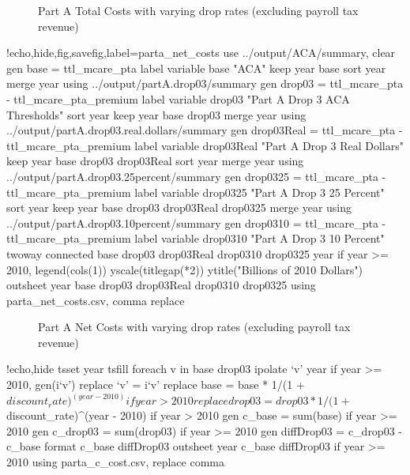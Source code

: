 \documentclass{article}
\begin{document}
\begin{figure}[ht]
\centering
{}
\caption{Part A Total Costs with varying drop rates (excluding payroll tax revenue)}
\label{fig:drop_costs}
\end{figure}

\begin{Statacode}{!echo,hide,fig,savefig,label=parta_net_costs}
use ../output/ACA/summary, clear
gen base = ttl_mcare_pta
label variable base "ACA"
keep year base
sort year
merge year using ../output/partA.drop03/summary
gen drop03 = ttl_mcare_pta - ttl_mcare_pta_premium
label variable drop03 "Part A Drop 3 ACA Thresholds"
sort year
keep year base drop03
merge year using ../output/partA.drop03.real.dollars/summary
gen drop03Real = ttl_mcare_pta - ttl_mcare_pta_premium
label variable drop03Real "Part A Drop 3 Real Dollars"
keep year base drop03 drop03Real
sort year
merge year using ../output/partA.drop03.25percent/summary
gen drop0325 = ttl_mcare_pta - ttl_mcare_pta_premium
label variable drop0325 "Part A Drop 3 25 Percent"
sort year
keep year base drop03 drop03Real drop0325
merge year using ../output/partA.drop03.10percent/summary
gen drop0310 = ttl_mcare_pta - ttl_mcare_pta_premium
label variable drop0310 "Part A Drop 3 10 Percent"
twoway connected base drop03 drop03Real drop0310 drop0325 year if year >= 2010, legend(cols(1)) yscale(titlegap(*2)) ytitle("Billions of 2010 Dollars")
outsheet year base drop03 drop03Real drop0310 drop0325 using parta_net_costs.csv, comma replace
\end{Statacode}

\begin{figure}[ht]
\centering
{}
\caption{Part A Net Costs with varying drop rates (excluding payroll tax revenue)}
\label{fig:parta_net_costs}
\end{figure}

\begin{Statacode}{!echo,hide}
tsset year
tsfill
foreach v in base drop03 {
  ipolate `v' year if year >= 2010, gen(i`v')
  replace `v' = i`v'
}
replace base = base * 1/(1 + $discount_rate)^(year - 2010) if year > 2010
replace drop03 = drop03 * 1/(1 + $discount_rate)^(year - 2010) if year > 2010
gen c_base = sum(base) if year >= 2010
gen c_drop03 = sum(drop03) if year >= 2010
gen diffDrop03 = c_drop03 - c_base
format c_base diffDrop03 %
outsheet year c_base diffDrop03 if year >= 2010 using parta_c_cost.csv, replace comma
\end{Statacode}
\end{document}
